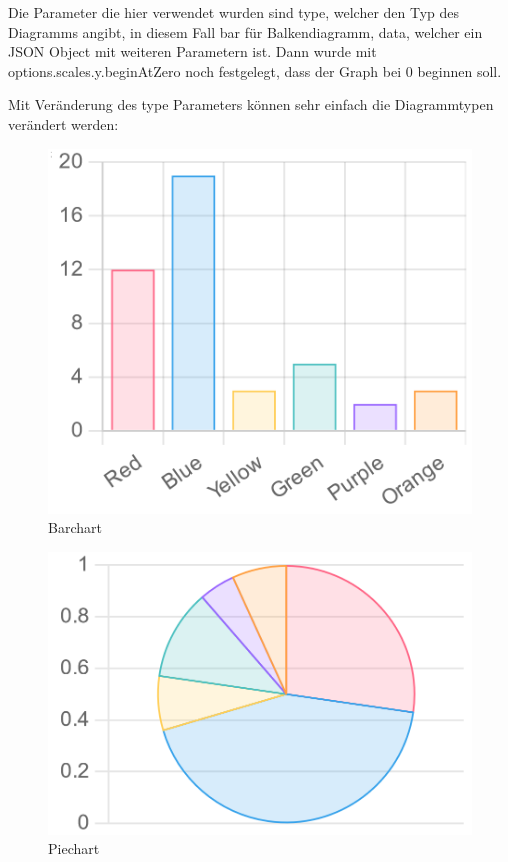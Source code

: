 Die Parameter die hier verwendet wurden sind type, welcher den Typ des Diagramms angibt,
in diesem Fall bar für Balkendiagramm, data, welcher ein JSON Object mit weiteren Parametern ist.
Dann wurde mit options.scales.y.beginAtZero noch festgelegt, dass der Graph bei 0 beginnen soll.

Mit Veränderung des type Parameters können sehr einfach die Diagrammtypen verändert werden:
\begin{figure}[H]
  \centering
  \includegraphics[scale=0.3]{pics/barChart.png}
  \caption{Barchart}
  \label{fig:tech:barchart}
\end{figure}
\begin{figure}[H]
  \centering
  \includegraphics[scale=0.3]{pics/pieChart.png}
  \caption{Piechart}
  \label{fig:tech:piechart}
\end{figure}
